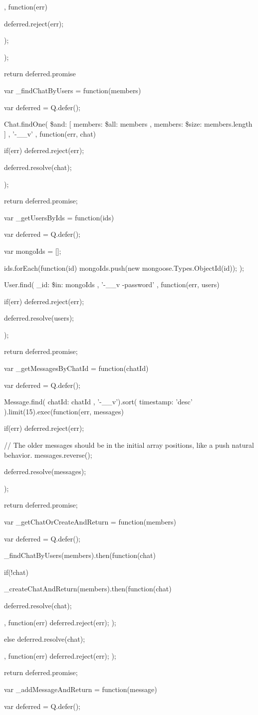\begin{flushleft}
{{{	}, function(err) {
	deferred.reject(err);
	
});

});

return deferred.promise
}

var \_findChatByUsers = function(members) {
	var deferred = Q.defer();
	
	Chat.findOne(
	{ \$and: [{ members: { \$all: members } }, { members: { \$size: members.length } }] }
	, '-\_\_v'
	, function(err, chat) {
		if(err)
		deferred.reject(err);
		
		deferred.resolve(chat);
	}
	);
	
	return deferred.promise;
}

var \_getUsersByIds = function(ids) {
	var deferred = Q.defer();
	
	var mongoIds = [];
	
	ids.forEach(function(id) {
		mongoIds.push(new mongoose.Types.ObjectId(id));
	});
	
	User.find({ \_id: { \$in: mongoIds }}
	, '-\_\_v -password'
	, function(err, users) {
		if(err)
		deferred.reject(err);
		
		deferred.resolve(users);
	});
	
	return deferred.promise;
}

var \_getMessagesByChatId = function(chatId) {
	var deferred = Q.defer();
	
	Message.find({ chatId: chatId }, '-\_\_v').sort({ timestamp: 'desc' }).limit(15).exec(function(err, messages) {
		if(err)
		deferred.reject(err);
		
		// The older messages should be in the initial array positions, like a push natural behavior.
		messages.reverse();
		
		deferred.resolve(messages);
	});
	
	return deferred.promise;
}

var \_getChatOrCreateAndReturn = function(members) {
	var deferred = Q.defer();
	
	\_findChatByUsers(members).then(function(chat) {
		if(!chat) {
			\_createChatAndReturn(members).then(function(chat) {
				deferred.resolve(chat);
				
			}, function(err) { deferred.reject(err); });
			
		} else {
		deferred.resolve(chat);
	}
	
}, function(err) { deferred.reject(err); });

return deferred.promise;
}

var \_addMessageAndReturn = function(message) {
	var deferred = Q.defer();
	
}
\end{flushleft}
